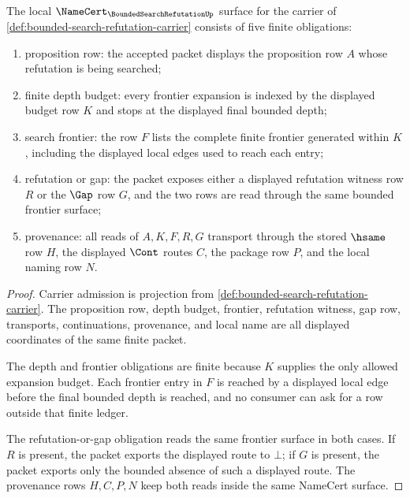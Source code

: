 \begin{theorem}
\label{thm:bounded-search-refutation-obligations}
The local $\NameCert_{\BoundedSearchRefutationUp}$ surface for the carrier of \autoref{def:bounded-search-refutation-carrier} consists of five finite obligations:
\begin{enumerate}
\item proposition row: the accepted packet displays the proposition row $A$ whose refutation is being searched;
\item finite depth budget: every frontier expansion is indexed by the displayed budget row $K$ and stops at the displayed final bounded depth;
\item search frontier: the row $F$ lists the complete finite frontier generated within $K$, including the displayed local edges used to reach each entry;
\item refutation or gap: the packet exposes either a displayed refutation witness row $R$ or the $\Gap$ row $G$, and the two rows are read through the same bounded frontier surface;
\item provenance: all reads of $A,K,F,R,G$ transport through the stored $\hsame$ row $H$, the displayed $\Cont$ routes $C$, the package row $P$, and the local naming row $N$.
\end{enumerate}
\end{theorem}
\begin{proof}
Carrier admission is projection from \autoref{def:bounded-search-refutation-carrier}. The proposition row, depth budget, frontier, refutation witness, gap row, transports, continuations, provenance, and local name are all displayed coordinates of the same finite packet.

The depth and frontier obligations are finite because $K$ supplies the only allowed expansion budget. Each frontier entry in $F$ is reached by a displayed local edge before the final bounded depth is reached, and no consumer can ask for a row outside that finite ledger.

The refutation-or-gap obligation reads the same frontier surface in both cases. If $R$ is present, the packet exports the displayed route to $\bot$; if $G$ is present, the packet exports only the bounded absence of such a displayed route. The provenance rows $H,C,P,N$ keep both reads inside the same NameCert surface.
\end{proof}

